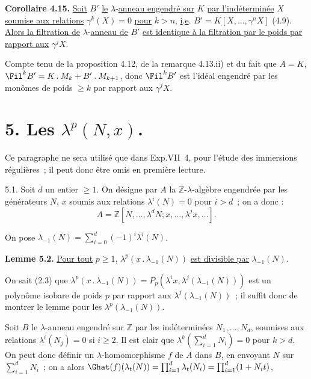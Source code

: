 
\textbf{Corollaire 4.15.} \uline{Soit} \(B'\) \uline{le} \(\lambda\)-\uline{anneau engendré sur} \(K\) \uline{par l'indéterminée} \(X\) \uline{soumise aux relations} \(\gamma^k(X)=0\) \uline{pour} \(k>n\), \uline{i}.\uline{e}. \(B'=K[X,\ldots,\gamma^n X]\) (4.9). \uline{Alors la filtration de} \(\lambda\)-\uline{anneau de} \(B'\) \uline{est identique à la filtration par le poids par rapport aux} \(\gamma^j X\).

Compte tenu de la proposition 4.12, de la remarque 4.13.ii) et du fait que \(A=K\), \(\Fil^k B'=K\mathbin{.} M_k+B'\mathbin{.} M_{k+1}\), donc \(\Fil^k B'\) est l'idéal engendré par les monômes de poids \(\ge k\) par rapport aux \(\gamma^j X\).

\section*{5. Les \(\lambda^p(N,x)\).}

Ce paragraphe ne sera utilisé que dans Exp.VII~4, pour l'étude des immersions régulières~; il peut donc être omis en première lecture.

5.1. Soit \(d\) un entier \(\ge1\). On désigne par \(A\) la \(\mathbb Z\)-\(\lambda\)-algèbre engendrée par les générateurs \(N\), \(x\) soumis aux relations \(\lambda^i(N)=0\) pour \(i>d\)~; on a donc :
\[
  A=\mathbb Z[N,\ldots,\lambda^dN;
       x,\ldots,\lambda^jx,\ldots].
\]

On pose \(\lambda_{-1}(N)=\sum_{i=0}^{d}(-1)^i\lambda^i(N)\).

\textbf{Lemme 5.2.} \uline{Pour tout} \(p\ge1\), \(\lambda^p(x\mathbin{.}\lambda_{-1}(N))\) \uline{est divisible par} \(\lambda_{-1}(N)\).

On sait (2.3) que \(\lambda^p(x\mathbin{.}\lambda_{-1}(N))=P_p(\lambda^i x,\lambda^j(\lambda_{-1}(N)))\) est un polynôme isobare de poids \(p\) par rapport aux \(\lambda^j(\lambda_{-1}(N))\)~; il suffit donc de montrer le lemme pour les \(\lambda^p(\lambda_{-1}(N))\).

Soit \(B\) le \(\lambda\)-anneau engendré sur \(\mathbb Z\) par les indéterminées \(N_1,\ldots,N_d\), soumises aux relations \(\lambda^i(N_j)=0\) si \(i\ge2\). Il est clair que \(\lambda^k(\sum_{i=1}^{d}N_i)=0\) pour \(k>d\). On peut donc définir un \(\lambda\)-homomorphisme \(f\) de \(A\) dans \(B\), en envoyant \(N\) sur \(\sum_{i=1}^{d}N_i\)~; on a alors \(\Ghat(f)(\lambda_t(N))=\prod_{i=1}^{d}\lambda_t(N_i)=\prod_{i=1}^{d}(1+N_it)\),
